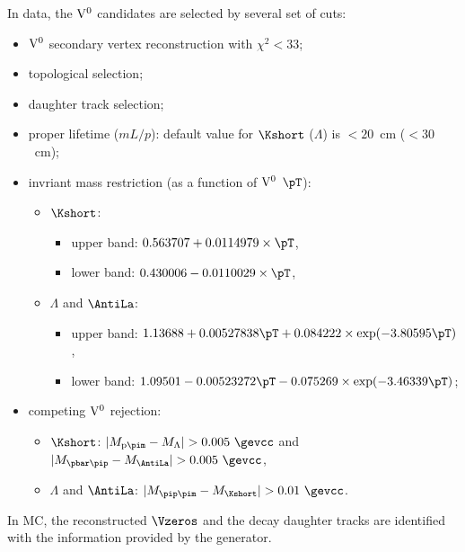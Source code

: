 In data, the ${\rm V}^{0}$ candidates are selected by several set of cuts:
\begin{itemize}
\item ${\rm V}^{0}$ secondary vertex reconstruction with $\chi^{2}<33$;
\item topological selection;
\item daughter track selection;
\item proper lifetime ($mL/p$):
      default value for $\Kshort$ ($\Lambda$) is $<20$~cm ($<30$~cm);
\item invriant mass restriction (as a function of ${\rm V}^{0}$ $\pT$):
      \begin{itemize}
      \item $\Kshort$:
            \begin{itemize}
            \item upper band: $0.563707+0.0114979\times\pT$,
            \item lower band: $0.430006-0.0110029\times\pT$,
            \end{itemize}
      \item $\Lambda$ and $\AntiLa$:
            \begin{itemize}
            \item upper band:
                  $1.13688+0.00527838\pT+0.084222\times\exp(-3.80595\pT)$,
            \item lower band:
                  $1.09501-0.00523272\pT-0.075269\times\exp(-3.46339\pT)$;
            \end{itemize}
      \end{itemize}
\item competing ${\rm V}^{0}$ rejection:
      \begin{itemize}
      \item $\Kshort$: $|M_{{\rm p}\pim}-M_{\Lambda}|>0.005~\gevcc$ and 
                       $|M_{\pbar\pip}-M_{\AntiLa}|>0.005~\gevcc$,
      \item $\Lambda$ and $\AntiLa$: $|M_{\pip\pim}-M_{\Kshort}|>0.01~\gevcc$.
      \end{itemize}
\end{itemize}

In MC, the reconstructed $\Vzeros$ and the decay daughter tracks are identified with the information provided by the generator.

